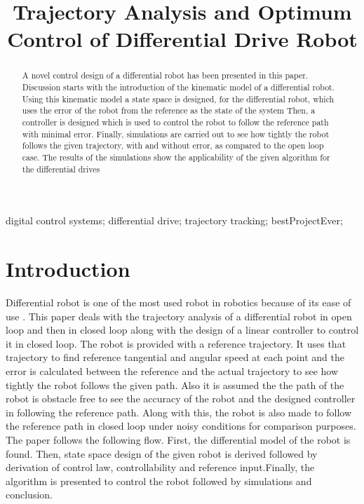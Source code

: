 \documentclass[conference]{IEEEtran}
\begin{document}
%
\title{Trajectory Analysis and Optimum Control of Differential Drive Robot}
\author{
}
\maketitle
\begin{abstract}
A novel control design of a differential robot has been presented in this paper. Discussion starts with the introduction of the kinematic model of a differential 
robot. Using this kinematic model a state space is designed, for the differential robot, which uses the error of the robot from the reference as the state of the system
Then, a controller is designed which is used to control the robot to follow the reference path with minimal error. Finally, simulations are carried out to see how
tightly the robot follows the given trajectory, with and without error, as compared to the open loop case. The results of the simulations show the applicability of the
given algorithm for the differential drives
\end{abstract}

\begin{keywords}
digital control systems; differential drive; trajectory tracking; bestProjectEver; 
\end{keywords}

\IEEEpeerreviewmaketitle
\section{Introduction}
Differential robot is one of the most used robot in robotics because of its ease of use \cite{papadopoulos2007differential}. This paper deals with the trajectory analysis of a differential robot in open loop
and then in closed loop along with the design of a linear controller to control it in closed loop. The robot is provided with a reference trajectory. It uses that  trajectory
to find reference tangential and angular speed at each point and the error is calculated between the reference and the actual trajectory to see how tightly the robot follows
the given path. Also it is assumed the the path of the robot is obstacle free to see the accuracy of the robot and the designed controller in following the reference path.
Along with this, the robot is also made to follow the reference path in closed loop under noisy conditions for comparison purposes. The paper follows the following flow. First,
the differential model of the robot is found. Then, state space design of the given robot is derived followed by derivation of control law, controllability and reference input.Finally,
the algorithm is presented to control the robot followed by simulations and conclusion.
\end{document}
